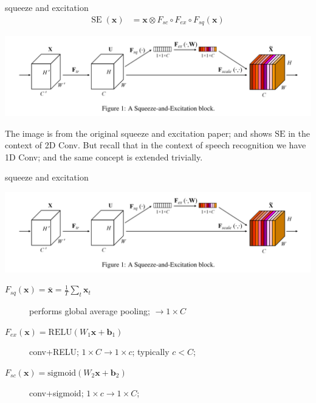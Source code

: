 \documentclass[aspectratio=169,xcolor={dvipsnames,svgnames}]{beamer}
\begin{document}
\begin{frame}[label={sec:org99b821d}]{squeeze and excitation}
\begin{align*}
  \mathrm{SE}\;(\mathbf{x})
  &= \mathbf{x} \otimes F_{sc}\circ F_{ex}\circ F_{sq}
    (\mathbf{x}) 
\end{align*}

\begin{center}
\includegraphics[width=.9\linewidth]{org-download-images/citrinet/2024-11-19_09-55-43_screenshot.png}
\end{center}

\scriptsize The image is from the original
squeeze and excitation paper; and shows \(\mathrm{SE}\)
in the context of 2D Conv.  But recall that in the
context of speech recognition we have 1D Conv; and the
same concept is extended trivially.
\end{frame}

\begin{frame}[label={sec:orga9f98b7}]{squeeze and excitation}
\begin{center}
\includegraphics[width=.9\linewidth]{org-download-images/citrinet/2024-11-19_09-55-43_screenshot.png}
\end{center}

\begin{description}
\item[{\(F_{sq} (\mathbf{x}) = \bar{\mathbf{x}} = \frac1T\sum_t\mathbf{x}_t\)}] performs global average pooling; \(\to 1\times C\)
\item[{\(F_{ex} (\mathbf{x}) = \mathrm{RELU}(W_1\mathbf{x} + \mathbf{b}_1)\)}] conv+RELU; \(1\times C\to1\times c\); typically \(c<C\);
\item[{\(F_{sc} (\mathbf{x}) = \mathrm{sigmoid}(W_2\mathbf{x} + \mathbf{b}_2)\)}] conv+sigmoid; \(1\times c \to 1\times C\);
\end{description}
\end{frame}
\end{document}
